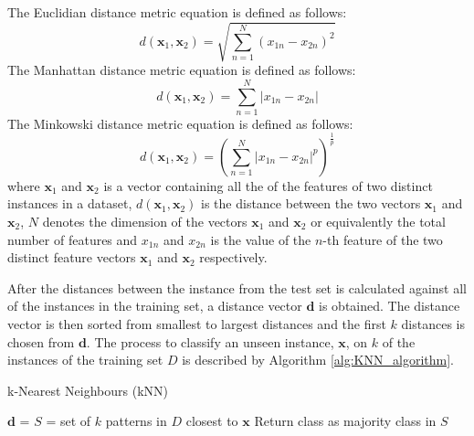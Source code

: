 \documentclass[10pt, conference]{IEEEtran}
\begin{document}
The Euclidian distance metric equation is defined as follows:
\begin{equation}
    d(\boldsymbol{\textbf{x}}_1, \boldsymbol{\textbf{x}}_2) = \sqrt{\sum_{n=1}^{N}(x_{1n} - x_{2n})^2} \label{euclidian}
\end{equation}
The Manhattan distance metric equation is defined as follows:
\begin{equation}
    d(\boldsymbol{\textbf{x}}_1, \boldsymbol{\textbf{x}}_2) = \sum_{n=1}^{N} \left| x_{1n} - x_{2n} \right| \label{manhattan}
\end{equation}
The Minkowski distance metric equation is defined as follows:
\begin{equation}
    d(\boldsymbol{\textbf{x}}_1, \boldsymbol{\textbf{x}}_2) = \left(\sum_{n=1}^{N} \left| x_{1n} - x_{2n} \right|^p\right)^\frac{1}{p} \label{minkowski}
\end{equation}
where $\boldsymbol{\textbf{x}}_1$ and $\boldsymbol{\textbf{x}}_2$ is a vector containing all the of the features of two
distinct instances in a dataset, $d(\boldsymbol{\textbf{x}}_1, \boldsymbol{\textbf{x}}_2)$ is the distance between the two
vectors $\boldsymbol{\textbf{x}}_1$ and $\boldsymbol{\textbf{x}}_2$, $N$ denotes the dimension of the vectors 
$\boldsymbol{\textbf{x}}_1$ and $\boldsymbol{\textbf{x}}_2$ or equivalently the total number of features and $x_{1n}$ and
$x_{2n}$ is the value of the $n$-th feature of the two distinct feature vectors $\boldsymbol{\textbf{x}}_1$ and
$\boldsymbol{\textbf{x}}_2$ respectively.

After the distances between the instance from the test set is calculated against all of the instances in the training set,
a distance vector $\boldsymbol{\textbf{d}}$ is obtained. The distance vector is then sorted from smallest to largest distances
and the first $k$ distances is chosen from $\boldsymbol{\textbf{d}}$. The process to classify an unseen instance,
$\boldsymbol{\textbf{x}}$, on $k$ of the instances of the training set $D$ is described by Algorithm \ref{alg:KNN_algorithm}.
\begin{algorithm}
\caption{k-Nearest Neighbours (kNN)}
\label{alg:KNN_algorithm}
\begin{algorithmic}[1]
            \State $\boldsymbol{\textbf{d}}$ = 
        \EndFor
        \State {}
        \State $S$ = set of $k$ patterns in $D$ closest to $\boldsymbol{\textbf{x}}$
        \State Return class as majority class in $S$
    \EndFunction
\end{algorithmic}
\end{algorithm}
\end{document}
